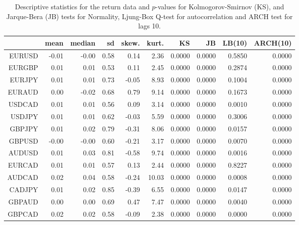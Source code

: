 \begin{table}[ht]
\centering
\begin{tabular}{rrrrrrrrrr}
  \hline
 & mean & median & sd & skew. & kurt. & KS & JB & LB(10) & ARCH(10) \\ 
  \hline
EURUSD & -0.01 & -0.00 & 0.58 & 0.14 & 2.36 & 0.0000 & 0.0000 & 0.5850 & 0.0000 \\ 
  EURGBP & 0.01 & 0.01 & 0.53 & 0.11 & 2.45 & 0.0000 & 0.0000 & 0.2874 & 0.0000 \\ 
  EURJPY & 0.01 & 0.01 & 0.73 & -0.05 & 8.93 & 0.0000 & 0.0000 & 0.1004 & 0.0000 \\ 
  EURAUD & 0.00 & -0.02 & 0.68 & 0.79 & 9.14 & 0.0000 & 0.0000 & 0.1673 & 0.0000 \\ 
  USDCAD & 0.01 & 0.01 & 0.56 & 0.09 & 3.14 & 0.0000 & 0.0000 & 0.0010 & 0.0000 \\ 
  USDJPY & 0.01 & 0.01 & 0.62 & -0.03 & 5.59 & 0.0000 & 0.0000 & 0.3006 & 0.0000 \\ 
  GBPJPY & 0.01 & 0.02 & 0.79 & -0.31 & 8.06 & 0.0000 & 0.0000 & 0.0157 & 0.0000 \\ 
  GBPUSD & -0.00 & -0.00 & 0.60 & -0.21 & 3.17 & 0.0000 & 0.0000 & 0.0070 & 0.0000 \\ 
  AUDUSD & 0.01 & 0.03 & 0.81 & -0.58 & 9.74 & 0.0000 & 0.0000 & 0.0016 & 0.0000 \\ 
  EURCAD & 0.01 & 0.01 & 0.57 & 0.13 & 2.44 & 0.0000 & 0.0000 & 0.8227 & 0.0000 \\ 
  AUDCAD & 0.02 & 0.04 & 0.58 & -0.24 & 10.03 & 0.0000 & 0.0000 & 0.0008 & 0.0000 \\ 
  CADJPY & 0.01 & 0.02 & 0.85 & -0.39 & 6.55 & 0.0000 & 0.0000 & 0.0147 & 0.0000 \\ 
  GBPAUD & 0.00 & 0.00 & 0.69 & 0.47 & 7.47 & 0.0000 & 0.0000 & 0.0040 & 0.0000 \\ 
  GBPCAD & 0.02 & 0.02 & 0.58 & -0.09 & 2.38 & 0.0000 & 0.0000 & 0.0000 & 0.0000 \\ 
   \hline
\end{tabular}
\caption{Descriptive statistics for the return data and
              $p$-values for Kolmogorov-Smirnov (KS), 
             and Jarque-Bera (JB) tests for Normality, 
             Ljung-Box Q-test for autocorrelation and ARCH test for lags 10.} 
\label{table:rets_desc_FX}
\end{table}
